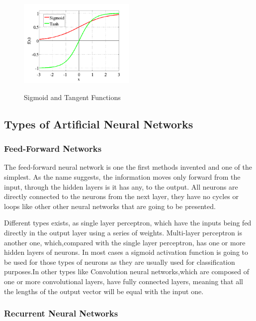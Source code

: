 \begin{figure}[htp]
	\centering
	\includegraphics[width=0.5\textwidth]{Illustrations/sigmoidandtangent.jpeg}
	\caption{Sigmoid and Tangent Functions}\cite{FUNCTION}
	\label{fig:SigmoidAndTangent}
\end{figure}

\subsection{Types of Artificial Neural Networks}

\subsubsection{Feed-Forward Networks}

The feed-forward neural network is one the first methods invented and one of the simplest. As the name suggests, the information moves only forward from the input, through the hidden layers is it has any, to the output. All neurons are directly connected to the neurons from the next layer, they have no cycles or loops like other other neural networks that are going to be presented.

Different types exists, as single layer perceptron, which have the inputs being fed directly in the output layer using a series of weights. Multi-layer perceptron is another one, which,compared with the single layer perceptron, has one or more hidden layers of neurons.
In most cases a sigmoid activation function is going to be used for those types of neurons as they are usually used for classification purposes.In other types like Convolution neural networks,which are composed of one or more convolutional layers, have fully connected layers, meaning that all the lengths of the output vector will be equal with the input one.

\subsubsection{Recurrent Neural Networks}

